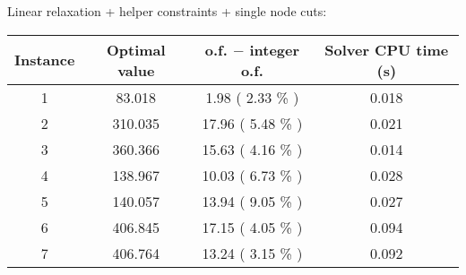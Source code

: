 Linear relaxation + helper constraints + single node cuts:
\begin{table}[h!]
	\centering
	\begin{tabular}{|c|c|c|c|}
		\hline
		\textbf{Instance} & \textbf{Optimal value} & \textbf{o.f. $-$ integer o.f.} & \textbf{Solver CPU time (s)} \\
		\hline
		1 &  83.018 &  1.98 ( 2.33 \% ) & 0.018 \\ \hline
		2 & 310.035 & 17.96 ( 5.48 \% ) & 0.021 \\ \hline
		3 & 360.366 & 15.63 ( 4.16 \% ) & 0.014 \\ \hline
		4 & 138.967 & 10.03 ( 6.73 \% ) & 0.028 \\ \hline
		5 & 140.057 & 13.94 ( 9.05 \% ) & 0.027 \\ \hline
		6 & 406.845 & 17.15 ( 4.05 \% ) & 0.094 \\ \hline
		7 & 406.764 & 13.24 ( 3.15 \% ) & 0.092 \\ \hline
	\end{tabular}
	\label{tab:instance_costs}
\end{table}
